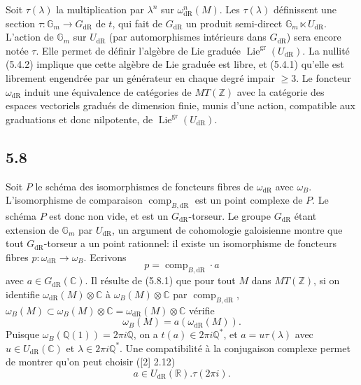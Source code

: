 \documentclass[10pt]{article}
\newcommand{\Q}{\mathbb Q}
\newcommand{\Z}{\mathbb Z}
\newcommand{\R}{\mathbb R}
\newcommand{\C}{\mathbb C}
\newcommand{\Gm}{\mathbb G_m}
\newcommand{\Lie}{\operatorname{Lie}}
\newcommand{\comp}{\operatorname{comp}}
\newcommand{\dR}{\mathrm{dR}}
\begin{document}
Soit $\tau(\lambda)$ la multiplication par $\lambda^n$ sur $\omega^n_{\dR}(M)$. Les $\tau(\lambda)$ définissent une section $\tau:\Gm\to G_{\dR}$ de $t$, qui fait de $G_{\dR}$ un produit semi-direct $\Gm\ltimes U_{\dR}$. L'action de $\Gm$ sur $U_{\dR}$ (par automorphismes intérieurs dans $G_{\dR}$) sera encore notée $\tau$. Elle permet de définir l'algèbre de Lie graduée $\Lie^{\mathrm{gr}}(U_{\dR})$. La nullité (5.4.2) implique que cette algèbre de Lie graduée est libre, et (5.4.1) qu'elle est librement engendrée par un générateur en chaque degré impair $\geq3$. Le foncteur $\omega_{\dR}$ induit une équivalence de catégories de $MT(\Z)$ avec la catégorie des espaces vectoriels gradués de dimension finie, munis d'une action, compatible aux graduations et donc nilpotente, de $\Lie^{\mathrm{gr}}(U_{\dR})$.

\subsection*{5.8}
Soit $P$ le schéma des isomorphismes de foncteurs fibres de $\omega_{\dR}$ avec $\omega_B$. L'isomorphisme de comparaison $\comp_{B,\dR}$ est un point complexe de $P$. Le schéma $P$ est donc non vide, et est un $G_{\dR}$-torseur. Le groupe $G_{\dR}$ étant extension de $\Gm$ par $U_{\dR}$, un argument de cohomologie galoisienne montre que tout $G_{\dR}$-torseur a un point rationnel: il existe un isomorphisme de foncteurs fibres $p:\omega_{\dR}\to\omega_B$. Ecrivons
\begin{equation}
 p=\comp_{B,\dR}\cdot a
\tag{5.8.1}
\end{equation}
avec $a\in G_{\dR}(\C)$. Il résulte de (5.8.1) que pour tout $M$ dans $MT(\Z)$, si on identifie $\omega_{\dR}(M)\otimes\C$ à $\omega_B(M)\otimes\C$ par $\comp_{B,\dR}$, $\omega_B(M)\subset\omega_B(M)\otimes\C=\omega_{\dR}(M)\otimes\C$ vérifie
\begin{equation}
 \omega_B(M)=a(\omega_{\dR}(M)).
\tag{5.8.2}
\end{equation}
Puisque $\omega_B(\Q(1))=2\pi i\Q$, on a $t(a)\in2\pi i\Q^*$, et $a=u\tau(\lambda)$ avec $u\in U_{\dR}(\C)$ et $\lambda\in2\pi i\Q^*$. Une compatibilité à la conjugaison complexe permet de montrer qu'on peut choisir ([2] 2.12)
\begin{equation}
 a\in U_{\dR}(\R).\tau(2\pi i).
\tag{5.8.3}
\end{equation}
\end{document}
